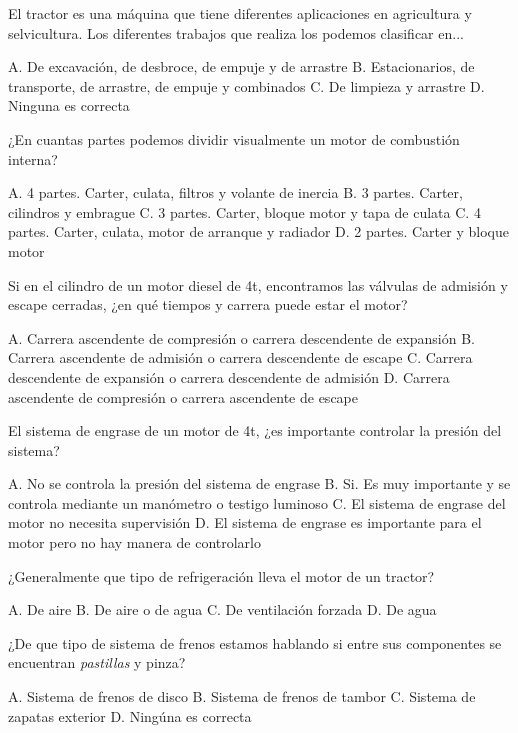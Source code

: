 \documentclass[answers,11pt]{exam}
\begin{document}
{\begin{questions}
\question El tractor es una máquina que tiene diferentes aplicaciones en agricultura y selvicultura. Los diferentes trabajos que realiza los podemos clasificar en...
\begin{checkboxes}
\choice A. De excavación, de desbroce, de empuje y de arrastre
\CorrectChoice B. Estacionarios, de transporte, de arrastre, de empuje y combinados
\choice C. De limpieza y arrastre
\choice D. Ninguna es correcta
\end{checkboxes}

\question ¿En cuantas partes podemos dividir visualmente un motor de combustión interna? 
\begin{checkboxes}
\choice A. 4 partes. Carter, culata, filtros y volante de inercia
\choice B. 3 partes. Carter, cilindros y embrague 
\CorrectChoice C. 3 partes. Carter, bloque motor y tapa de culata
\choice C. 4 partes. Carter, culata, motor de arranque y radiador    
\choice D. 2 partes. Carter y bloque motor
\end{checkboxes}

\question Si en el cilindro de un motor diesel de 4t, encontramos las válvulas de admisión y escape cerradas, ¿en  qué tiempos y carrera puede estar el motor?
\begin{checkboxes}
\CorrectChoice A. Carrera ascendente de compresión o carrera descendente de expansión 
\choice B. Carrera ascendente de admisión o carrera descendente de escape
\choice C. Carrera descendente de expansión o carrera descendente de admisión
\choice D. Carrera ascendente de compresión o carrera ascendente de escape
\end{checkboxes}

\question El sistema de engrase de un motor de 4t, ¿es importante controlar la presión del sistema?
\begin{checkboxes}
\choice A. No se controla la presión del sistema de engrase
\CorrectChoice B. Si. Es muy importante y se controla mediante un manómetro o testigo luminoso
\choice C. El sistema de engrase del motor no necesita supervisión
\choice D. El sistema de engrase es importante para el motor pero no hay manera de controlarlo
\end{checkboxes}

\question ¿Generalmente que tipo de refrigeración lleva el motor de un tractor?
\begin{checkboxes}
\choice A. De aire
\choice B. De aire o de agua
\choice C. De ventilación forzada
\CorrectChoice D. De agua
\end{checkboxes}
\newpage 
\question ¿De que tipo de sistema de frenos estamos hablando si entre sus componentes se encuentran \emph{pastillas} y pinza?
\begin{checkboxes}
\CorrectChoice A. Sistema de frenos de disco
\choice B. Sistema de frenos de tambor
\choice C. Sistema de zapatas exterior
\choice D. Ningúna es correcta
\end{checkboxes}


\end{questions}}
\end{document}
